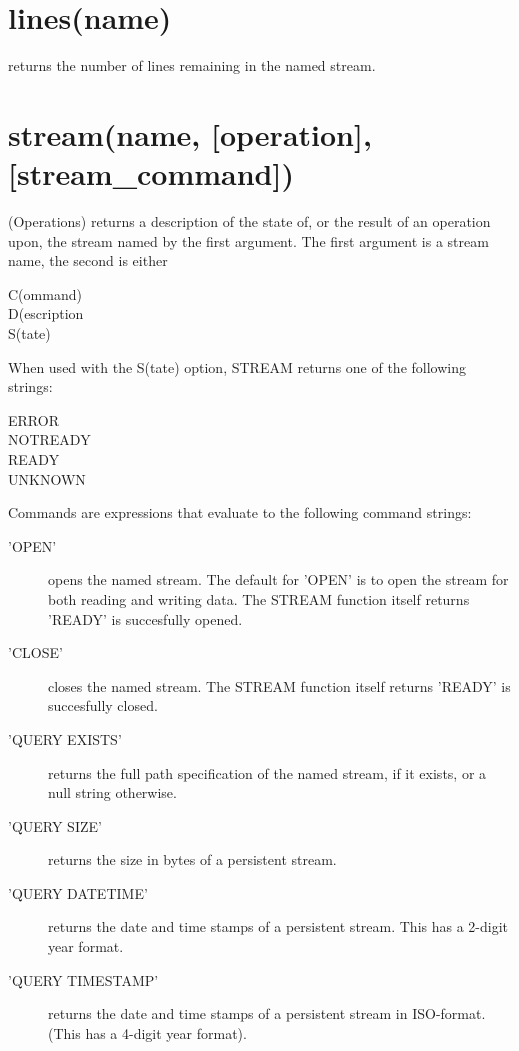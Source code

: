 \section{lines(name)} returns the number of lines remaining in the named stream.

\section{stream(name, [operation{]}, [stream\_command{]})}    (Operations) returns a description of the state of, or the result of an
operation upon, the stream named by the first argument. The first
argument is a stream name, the second is either
\begin{description}
\item[C(ommand)]
\item[D(escription]
\item[S(tate)]
\end{description}

When used with the S(tate) option, STREAM
returns one of the following strings:
\begin{description}
\item[ERROR]
\item[NOTREADY]
\item[READY]
\item[UNKNOWN]
\end{description}

Commands are expressions that evaluate to the following command
strings:
\begin{description}
  \item['OPEN'] opens the named stream. The default for 'OPEN' is to
    open the stream for both reading and writing data. The STREAM function itself
    returns 'READY' is succesfully opened.
  \item['CLOSE'] closes the named stream. The STREAM function itself
    returns 'READY' is succesfully closed.
  \item['QUERY EXISTS'] returns the full path specification of the
    named stream, if it exists, or a null string otherwise.
  \item['QUERY SIZE'] returns the size in bytes of a persistent
    stream.
  \item['QUERY DATETIME'] returns the date and time stamps of a
    persistent stream. This has a 2-digit year format.
  \item['QUERY TIMESTAMP'] returns the date and time stamps of a
    persistent stream in ISO-format. (This has a 4-digit year format).
  \end{description}

